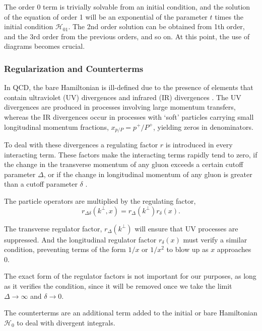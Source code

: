 \documentclass[11pt,a4paper,twoside,pdf]{article}
\numberwithin{equation}{section}
\begin{document}
The order 0 term is trivially solvable from an initial condition, and the solution of the 
equation of order 1 will be an exponential of the parameter $t$ times the initial condition $\mathcal{H}_{01}$. The 2nd order 
solution can be obtained from 1th order, and the 3rd order from the previous orders, 
and so on. At this point, the use of diagrams becomes crucial.


\subsubsection{Regularization and Counterterms}\label{sec:regulatrization_countertems}

In QCD, the bare Hamiltonian is ill-defined due to the presence of elements 
that contain ultraviolet (UV) divergences and infrared (IR) divergences
\cite{QCDG,glazek_renormalization_1993}.
The UV divergences are produced in processes involving large momentum transfers, 
whereas the IR divergences occur in processes with ‘soft’ particles carrying small 
longitudinal momentum fractions, $x_{p/P} = p^+/P^+$, yielding zeros in  
denominators.

To deal with these divergences a regulating factor $r$ is 
introduced in every interacting term. These factors make the interacting terms rapidly 
tend to zero, if the change in the transverse momentum of any gluon exceeds a certain
cutoff parameter $\Delta$, or if the change in longitudinal momentum of any gluon is
greater than a cutoff parameter $\delta$ \cite{Collins_1984}. 


The particle operators are multiplied by the regulating factor, 
\begin{equation}
    r_{\Delta \delta} (k^\perp, x) = r_\Delta (k^\perp) r_\delta(x).
\end{equation}

The transverse regulator factor, $r_\Delta (k^\perp)$ will ensure that UV processes are suppressed.
And the longitudinal regulator factor $r_\delta(x)$ must verify a similar condition, preventing terms
of the form $1/x$ or $1/x^2$ to blow up as $x$ approaches 0. 

The exact form of the regulator factors is not important for our purposes, as long as it 
verifies the condition, since it will be removed once we take the
limit $\Delta \to \infty$ and $\delta \to 0$.


The counterterms are an additional term added to the initial or bare Hamiltonian 
$\mathcal{H}_0$ to deal with divergent integrals. 
\end{document}
